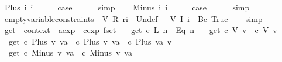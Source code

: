 \begin{isabellebody}
\ {\isacharparenleft}Plus\ i{}\ i{}{\isacharparenright}\isanewline
\ \ \isamarkupfalse%
\ \isamarkupfalse%
\ {\isacharquery}case\isanewline
\ \ \ \ \isamarkupfalse%
\ simp\isanewline
{}\isamarkupfalse%
\isanewline
\ \ \isamarkupfalse%
\ {\isacharparenleft}Minus\ i{}\ i{}{\isacharparenright}\isanewline
\ \ \isamarkupfalse%
\ \isamarkupfalse%
\ {\isacharquery}case\isanewline
\ \ \ \ \isamarkupfalse%
\ simp\isanewline
{}\isamarkupfalse%
%
\endisatagproof
{\isafoldproof}%
%
\isadelimproof
\isanewline
%
\endisadelimproof
\isanewline
{}\isamarkupfalse%
\ empty{\isacharunderscore}variable{\isacharunderscore}constraints{\isacharcolon}\ {\isachardoublequoteopen}{\isasymlbrakk}{\isasymrbrakk}\ {\isacharparenleft}V\ {\isacharparenleft}R\ ri{\isacharparenright}{\isacharparenright}\ {\isacharequal}\ {\isacharbraceleft}{\isacharbar}Undef{\isacharbar}{\isacharbraceright}\ {\isasymand}\ {\isasymlbrakk}{\isasymrbrakk}\ {\isacharparenleft}V\ {\isacharparenleft}I\ i{\isacharparenright}{\isacharparenright}\ {\isacharequal}\ {\isacharbraceleft}{\isacharbar}Bc\ True{\isacharbar}{\isacharbraceright}{\isachardoublequoteclose}\isanewline
%
\isadelimproof
\ \ %
\endisadelimproof
%
\isatagproof
{}\isamarkupfalse%
\ simp%
\endisatagproof
{\isafoldproof}%
%
\isadelimproof
\isanewline
%
\endisadelimproof
\isanewline
{}\isamarkupfalse%
\ get\ {\isacharcolon}{\isacharcolon}\ {\isachardoublequoteopen}context\ {\isasymRightarrow}\ aexp\ {\isasymRightarrow}\ cexp\ fset{\isachardoublequoteclose}\ \isanewline
\ \ {\isachardoublequoteopen}get\ c\ {\isacharparenleft}L\ n{\isacharparenright}\ {\isacharequal}\ {\isacharbraceleft}{\isacharbar}Eq\ n{\isacharbar}{\isacharbraceright}{\isachardoublequoteclose}\ {\isacharbar}\isanewline
\ \ {\isachardoublequoteopen}get\ c\ {\isacharparenleft}V\ v{\isacharparenright}\ {\isacharequal}\ c\ {\isacharparenleft}V\ v{\isacharparenright}{\isachardoublequoteclose}\ {\isacharbar}\isanewline
\ \ {\isachardoublequoteopen}get\ c\ {\isacharparenleft}Plus\ v\ va{\isacharparenright}\ {\isacharequal}\ {\isacharparenleft}c\ {\isacharparenleft}Plus\ v\ va{\isacharparenright}{\isacharparenright}\ {\isacharbar}{\isasymunion}{\isacharbar}\ {\isacharparenleft}c\ {\isacharparenleft}Plus\ va\ v{\isacharparenright}{\isacharparenright}{\isachardoublequoteclose}\ {\isacharbar}\isanewline
\ \ {\isachardoublequoteopen}get\ c\ {\isacharparenleft}Minus\ v\ va{\isacharparenright}\ {\isacharequal}\ {\isacharparenleft}c\ {\isacharparenleft}Minus\ v\ va{\isacharparenright}{\isacharparenright}{\isachardoublequoteclose}\isanewline

\end{isabellebody}
